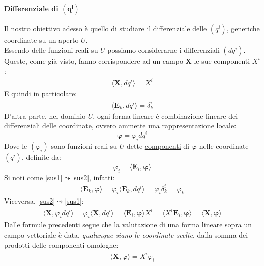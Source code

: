 \paragraph{Differenziale di $\mathbf{(q^i)}$} Il nostro obiettivo adesso è quello di studiare il differenziale delle $(q^i)$, generiche coordinate su un aperto $U$.\\
Essendo delle funzioni reali su $U$ possiamo considerarne i differenziali $(dq^i)$. Queste, come già visto, fanno corrispondere ad un campo $\mathbf{X}$ le sue componenti $X^i$:
\begin{align*}
    \langle\mathbf{X},dq^i\rangle=X^i
\end{align*}
E quindi in particolare:
\begin{align*}
    \langle \mathbf{E}_k,dq^i\rangle=\delta_k^i
\end{align*}
D'altra parte, nel dominio $U$, ogni forma lineare è combinazione lineare dei differenziali delle coordinate, ovvero ammette una rappresentazione locale:
\begin{equation}
    \label{sus1}
    \mathbf{\varphi}=\varphi_idq^i
\end{equation}
Dove le $(\varphi_i)$ sono funzioni reali su $U$ dette \uline{componenti} di $\mathbf{\varphi}$ nelle coordinate $(q^i)$, definite da:
\begin{equation}
    \label{sus2}
    \varphi_i=\langle\mathbf{E}_i,\mathbf{\varphi}\rangle
\end{equation}
Si noti come \ref{sus1}$\leadsto$\ref{sus2}, infatti:
\begin{align*}
    \langle \mathbf{E}_k,\mathbf{\varphi}\rangle = \varphi_i\langle \mathbf{E}_k,dq^i\rangle = \varphi_i \delta_k^i=\varphi_k
\end{align*}
Viceversa, \ref{sus2}$\leadsto$\ref{sus1}:
\begin{align*}
    \langle \mathbf{X},\varphi_idq^i\rangle=\varphi_i \langle \mathbf{X},dq^i\rangle= \langle \mathbf{E}_i, \mathbf{\varphi}\rangle X^i=\langle X^i\mathbf{E}_i, \mathbf{\varphi}\rangle =\langle \mathbf{X}, \mathbf{\varphi}\rangle
\end{align*}
Dalle formule precedenti segue che la valutazione di una forma lineare sopra un campo vettoriale è data, \textit{qualunque siano le coordinate scelte}, dalla somma dei prodotti delle componenti omologhe:
\begin{align*}
    \boxed{\langle \mathbf{X},\mathbf{\varphi}\rangle = X^i\varphi_i}
\end{align*}
